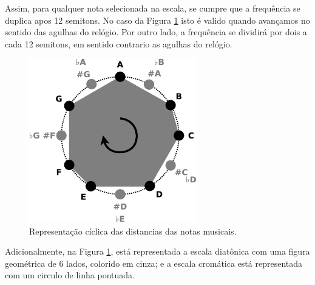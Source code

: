 Assim, para qualquer nota selecionada na escala, 
se cumpre que a frequência se duplica apos 12 semitons.
No caso da Figura \ref{fig:circulonotas} isto é valido quando avançamos no sentido das agulhas do relógio.
Por outro lado, a frequência se dividirá por dois a cada 12 semitons,
em sentido contrario as agulhas do relógio.
    \begin{figure}[h]
        \centering
        \includegraphics[width=0.65\textwidth]{chapters/cap-musica-basica/circulonotas.eps}
        \caption{Representação cíclica das distancias das notas musicais.}
        \label{fig:circulonotas}
    \end{figure}

Adicionalmente, na Figura \ref{fig:circulonotas}, 
está representada a escala diatônica com uma figura geométrica de 6 lados, 
colorido em cinza; e a escala cromática está representada com um circulo de linha pontuada.




